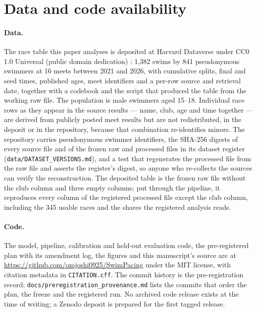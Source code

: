 \section*{Data and code availability}

\paragraph{Data.} The race table this paper analyses is deposited at Harvard
Dataverse under CC0 1.0 Universal (public domain dedication)
\citep{joshi2026dataset}: 1,382 swims by 841 pseudonymous swimmers at 16
meets between 2021 and 2026, with cumulative splits, final and seed times,
published ages, meet identifiers and a per-row source and retrieval date,
together with a codebook and the script that produced the table from the
working raw file. The population is male swimmers aged 15--18. Individual
race rows as they appear in the source results --- name, club, age and time
together --- are derived from publicly posted meet results but are not
redistributed, in the deposit or in the repository, because that combination
re-identifies minors. The repository carries pseudonymous swimmer
identifiers, the SHA-256 digests of every source file and of the frozen raw
and processed files in its dataset register
(\texttt{data/DATASET\_VERSIONS.md}), and a test that regenerates the
processed file from the raw file and asserts the register's digest, so anyone
who re-collects the sources can verify the reconstruction. The deposited
table is the frozen raw file without the club column and three empty
columns; put through the pipeline, it reproduces every column of the
registered processed file except the club column, including the 345 usable
races and the shares the registered analysis reads.

\paragraph{Code.} The model, pipeline, calibration and held-out evaluation
code, the pre-registered plan with its amendment log, the figures and this
manuscript's source are at \url{https://github.com/omjoshi0925/SwimPacing}
under the MIT license, with citation metadata in \texttt{CITATION.cff}. The
commit history is the pre-registration record;
\texttt{docs/preregistration\_provenance.md} lists the commits that order the
plan, the freeze and the registered run. No archived code release exists at
the time of writing; a Zenodo deposit is prepared for the first tagged
release.
